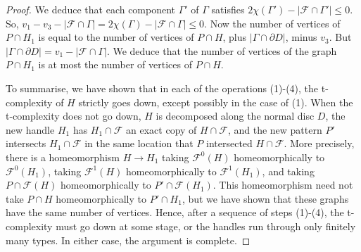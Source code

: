\documentclass[oneside]{amsart}
\numberwithin{equation}{section}
\theoremstyle{plain}
\theoremstyle{definition}
\begin{document}
\begin{proof}
We deduce that each component $\Gamma'$ of $\Gamma$ satisfies $2\chi(\Gamma') - |\mathcal{F} \cap \Gamma'| \leq 0$. So, $v_1 - v_3 - |\mathcal{F} \cap \Gamma| = 2 \chi(\Gamma) - |\mathcal{F} \cap \Gamma| \leq 0$. Now the number of vertices of $P \cap H_1$ is equal to the number of vertices of $P \cap H$, plus $|\Gamma \cap \partial D|$, minus $v_3$. But $|\Gamma \cap \partial D| = v_1 - |\mathcal{F} \cap \Gamma|$. We deduce that the number of vertices of the graph $P \cap H_1$ is at most the number of vertices of $P \cap H$. 

To summarise, we have shown that in each of the operations (1)-(4), the t-complexity of $H$ strictly goes down, except possibly in the case of (1). When the t-complexity does not go down, $H$ is decomposed along the normal disc $D$, the new handle $H_1$ has $H_1 \cap \mathcal{F}$ an exact copy of $H \cap \mathcal{F}$, and the new pattern $P'$ intersects $H_1 \cap \mathcal{F}$ in the same location that $P$ intersected $H \cap \mathcal{F}$. More precisely, there is a homeomorphism $H \rightarrow H_1$ taking $\mathcal{F}^0(H)$ homeomorphically to $\mathcal{F}^0(H_1)$, taking $\mathcal{F}^1(H)$ homeomorphically to $\mathcal{F}^1(H_1)$, and taking $P \cap \mathcal{F}(H)$ homeomorphically to $P' \cap \mathcal{F}(H_1)$. This homeomorphism need not take $P \cap H$ homeomorphically to $P' \cap H_1$, but we have shown that these graphs have the same number of vertices. Hence, after a sequence of steps (1)-(4), the t-complexity must go down at some stage, or the handles run through only finitely many types. In either case, the argument is complete.
\end{proof}
\end{document}
